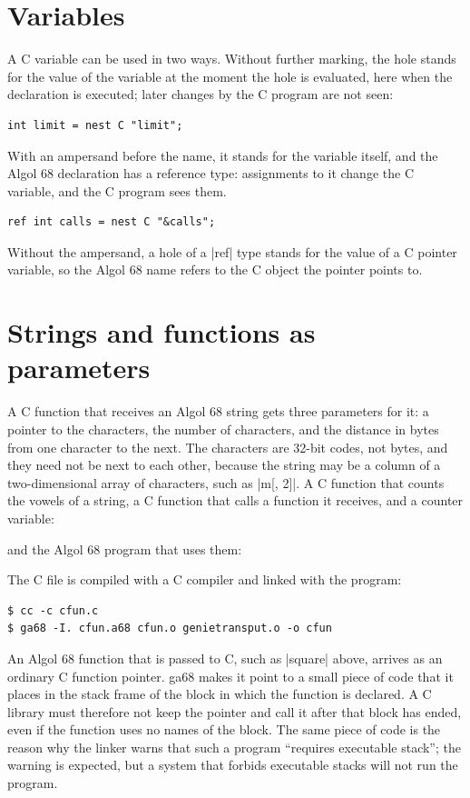 \section*{Variables}

A C variable can be used in two ways. Without further marking, the hole
stands for the value of the variable at the moment the hole is
evaluated, here when the declaration is executed; later changes by the C
program are not seen:
\begin{lstlisting}
int limit = nest C "limit";
\end{lstlisting}
With an ampersand before the name, it stands for the variable itself,
and the Algol 68 declaration has a reference type: assignments to it
change the C variable, and the C program sees them.
\begin{lstlisting}
ref int calls = nest C "&calls";
\end{lstlisting}
Without the ampersand, a hole of a \code|ref| type stands for the value of
a C pointer variable, so the Algol 68 name refers to the C object the
pointer points to.

\section*{Strings and functions as parameters}

A C function that receives an Algol 68 string gets three parameters for
it: a pointer to the characters, the number of characters, and the
distance in bytes from one character to the next. The characters are
32-bit codes, not bytes, and they need not be next to each other, because
the string may be a column of a two-dimensional array of characters,
such as \code|m[, 2]|. A C function that counts the
vowels of a string, a C function that calls a function it receives, and a
counter variable:


\noindent and the Algol 68 program that uses them:


\noindent The C file is compiled with a C compiler and linked with the
program:
\begin{lstlisting}[style=shell]
$ cc -c cfun.c
$ ga68 -I. cfun.a68 cfun.o genietransput.o -o cfun
\end{lstlisting}
An Algol 68 function that is passed to C, such as \code|square| above,
arrives as an ordinary C function pointer. ga68 makes it point to a small
piece of code that it places in the stack frame of the block in which
the function is declared. A C library must therefore not keep the
pointer and call it after that block has ended, even if the function
uses no names of the block. The same piece of code is the reason why the
linker warns that such a program ``requires executable stack''; the
warning is expected, but a system that forbids executable stacks will
not run the program.
